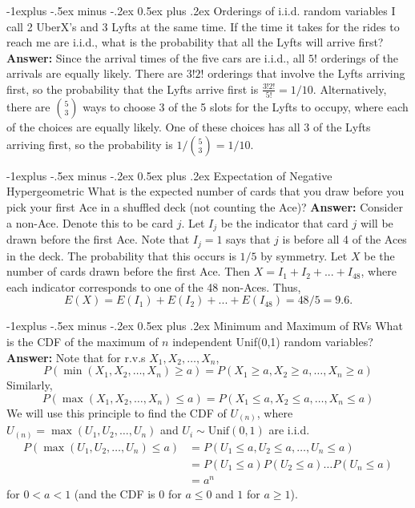 \documentclass[10pt,landscape]{article}
\makeatletter
\newcommand{\Unif}{\textrm{Unif}}
\renewcommand{\subsection}{\@startsection{subsection}{2}{0mm}%
{-1explus -.5ex minus -.2ex}%
{0.5ex plus .2ex}%
{\normalfont\normalsize\bfseries}}
\makeatother
\begin{document}
\begin{multicols*}{3}
        \subsection{Orderings of i.i.d. random variables}
        I call 2 UberX's and 3 Lyfts at the same time. If the time it takes for the rides to reach me are i.i.d., what is the probability that all the Lyfts will arrive first? \textbf{Answer:} Since the arrival times of the five cars are i.i.d., all $5!$ orderings of the arrivals are equally likely. There are $3!2!$ orderings that involve the Lyfts arriving first, so the probability that the Lyfts arrive first is $\boxed{\frac{3!2!}{5!} = 1/10}$. Alternatively, there are ${5 \choose 3}$ ways to choose 3 of the 5 slots for the Lyfts to occupy, where each of the choices are equally likely. One of these choices has all 3 of the Lyfts arriving first, so the probability is $\boxed{1 / {5 \choose 3} = 1/10}$.

        \subsection{Expectation of Negative Hypergeometric}
        What is the expected number of cards that you draw before you pick your first Ace in a shuffled deck (not counting the Ace)?
        \textbf{Answer:} Consider a non-Ace. Denote this to be card $j$. Let $I_j$ be the indicator that card $j$ will be drawn before the first Ace. Note that $I_j=1$ says that  $j$ is before all 4 of the Aces in the deck. The probability that this occurs is $1/5$ by symmetry. Let $X$ be the number of cards drawn before the first Ace. Then $X = I_1 + I_2 + ... + I_{48}$, where each indicator corresponds to one of the 48 non-Aces. Thus, \[E(X) = E(I_1) + E(I_2) + ... + E(I_{48}) = 48/5 = \boxed{9.6}.\]

        \subsection{Minimum and Maximum of RVs}
        What is the CDF of the maximum of $n$ independent Unif(0,1) random variables? \textbf{Answer:} Note that for r.v.s $X_1,X_2,\dots,X_n$,
        \[ P(\min(X_1, X_2, \dots, X_n) \geq a) = P(X_1 \geq a, X_2 \geq a, \dots, X_n \geq a) \] Similarly, \[ P(\max(X_1, X_2, \dots, X_n) \leq a) = P(X_1 \leq a, X_2 \leq a, \dots, X_n \leq a) \] We will use this principle to find the CDF of $U_{(n)}$, where $U_{(n)} = \max(U_1, U_2, \dots, U_n)$ and $U_i \sim \Unif(0, 1)$ are i.i.d.
        \begin{align*}
            P(\max(U_1, U_2, \dots, U_n) \leq a)
            & = P(U_1 \leq a, U_2 \leq a, \dots, U_n \leq a)  \\
            & = P(U_1 \leq a)P(U_2 \leq a)\dots P(U_n \leq a) \\
            & = \boxed{a^n}
        \end{align*}
        for $0<a<1$ (and the CDF is $0$ for $a \leq 0$ and $1$ for $a \geq 1$).


\end{multicols*}
\end{document}
